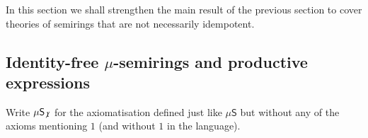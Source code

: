 \documentclass[a4paper,10pt]{amsart}
\renewcommand{\epsilon}{\varepsilon}
\newtheorem{theorem}{Theorem}
\theoremstyle{definition}
\newtheorem{definition}[theorem]{Definition}
\newcommand{\Alphabet}{\mathcal{A}}
\newcommand{\Var}{\mathcal{V}}
\newcommand{\basicax}{\mu\mathsf{S}}
\newcommand{\regtot}{\mathbf R}
\newcommand{\tot}{\mathbf T}
\newcommand{\basicaxidfree}{\basicax_{\not {\hspace{.1em}1}}}
\begin{document}
In this section we shall strengthen the main result of the previous section to cover theories of semirings that are not necessarily idempotent.




    



\subsection{Identity-free $\mu$-semirings and productive expressions}

Write $\basicaxidfree$ for the axiomatisation defined just like $\basicax$ but without any of the axioms mentioning $1$ (and without $1$ in the language).
\end{document}
